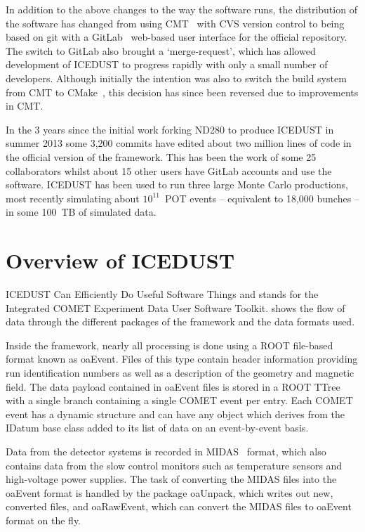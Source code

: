 In addition to the above changes to the way the software runs, the distribution of the software has changed from using CMT~\cite{cmt} with CVS version control to being based on git with a GitLab~\cite{GitLab} web-based user interface for the official repository.
The switch to GitLab also brought a `merge-request', which has allowed development of ICEDUST to progress rapidly with only a small number of developers.
Although initially the intention was also to switch the build system from CMT to CMake~\cite{cmake}, this decision has since been reversed due to improvements in CMT.

In the 3 years since the initial work forking ND280 to produce ICEDUST in summer 2013 some 3,200 commits have edited about two million lines of code in the official version of the framework.
This has been the work of some 25 collaborators whilst about 15 other users have GitLab accounts and use the software.
ICEDUST has been used to run three large Monte Carlo productions, most recently simulating about $10^{11}$~\ac{POT} events -- equivalent to 18,000 \phaseI bunches -- in some 100~TB of simulated data.

\section{Overview of ICEDUST}
ICEDUST Can Efficiently Do Useful Software Things and stands for the Integrated COMET Experiment Data User Software Toolkit.
 shows the flow of data through the different packages of the framework and the data formats used.

\FigICEDUSTOverview

Inside the framework, nearly all processing is done using a ROOT file-based format known as oaEvent.  
Files of this type contain header information providing run identification numbers as well as a description of the geometry and magnetic field.  
The data payload contained in oaEvent files is stored in a ROOT TTree with a single branch containing a single COMET event per entry.
Each COMET event has a dynamic structure and can have any object which derives from the IDatum base class added to its list of data on an event-by-event basis.

Data from the detector systems is recorded in MIDAS~\cite{MIDAS} format, which also contains data from the slow control monitors such as temperature sensors and high-voltage power supplies.
The task of converting the MIDAS files into the oaEvent format is handled by the package oaUnpack, which writes out new, converted files, and oaRawEvent, which can convert the MIDAS files to oaEvent format on the fly.

